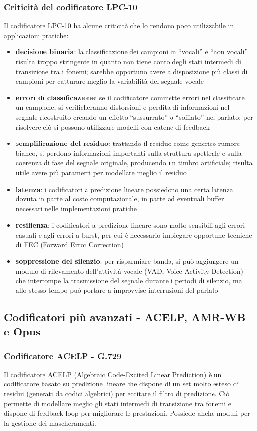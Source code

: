 \subsubsection*{Criticità del codificatore LPC-10}
Il codificatore LPC-10 ha alcune criticità che lo rendono poco utilizzabile in applicazioni pratiche:
\begin{itemize}
	\item \textbf{decisione binaria}: la classificazione dei campioni in ``vocali'' e ``non vocali'' risulta troppo
	stringente in quanto non tiene conto degli stati intermedi di transizione tra i fonemi; sarebbe opportuno
	avere a disposizione più classi di campioni per catturare meglio la variabilità del segnale vocale
	\item \textbf{errori di classificazione}: se il codificatore commette errori nel classificare un campione, si
	verificheranno distorsioni e perdita di informazioni nel segnale ricostruito creando un effetto ``sussurrato''
	o ``soffiato'' nel parlato; per risolvere ciò si possono utilizzare modelli con catene di feedback
	\item \textbf{semplificazione del residuo}: trattando il residuo come generico rumore bianco, si perdono informazioni
	importanti sulla struttura spettrale e sulla coerenza di fase del segnale originale, producendo un timbro artificiale;
	risulta utile avere più parametri per modellare meglio il residuo
	\item \textbf{latenza}: i codificatori a predizione lineare possiedono una certa latenza dovuta in parte al costo
	computazionale, in parte ad eventuali buffer necessari nelle implementazioni pratiche
	\item \textbf{resilienza}: i codificatori a predizione lineare sono molto sensibili agli errori casuali e agli errori
	a burst, per cui è necessario impiegare opportune tecniche di FEC (Forward Error Correction)
	\item \textbf{soppressione del silenzio}: per risparmiare banda, si può aggiungere un modulo di rilevamento dell'attività
	vocale (VAD, Voice Activity Detection) che interrompe la trasmissione del segnale durante i periodi di silenzio, ma allo
	stesso tempo può portare a improvvise interruzioni del parlato
\end{itemize}

\subsection{Codificatori più avanzati - ACELP, AMR-WB e Opus}
\subsubsection*{Codificatore ACELP - G.729}
Il codificatore ACELP (Algebraic Code-Excited Linear Prediction) è un codificatore basato su predizione lineare che
dispone di un set molto esteso di residui (generati da codici algebrici) per eccitare il filtro di predizione. Ciò
permette di modellare meglio gli stati intermedi di transizione tra fonemi e dispone di feedback loop per migliorare
le prestazioni. Possiede anche moduli per la gestione dei mascheramenti.

